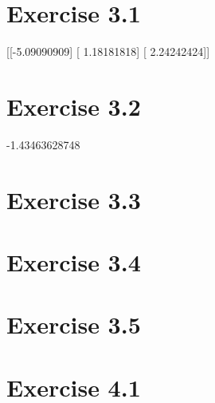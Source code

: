 \documentclass{article}
\begin{document}
\section{Exercise 3.1}

[[-5.09090909]
 [ 1.18181818]
 [ 2.24242424]]

\section{Exercise 3.2}
 
-1.43463628748

\section{Exercise 3.3}



\section{Exercise 3.4}
\section{Exercise 3.5}

\section{Exercise 4.1}
\end{document}
